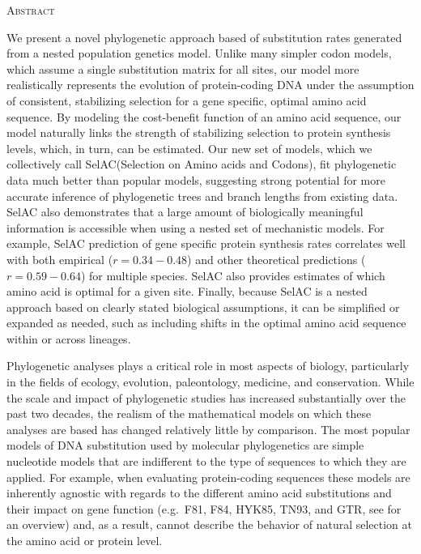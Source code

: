 \documentclass[12pt,letterpaper,fleqn]{article}
\renewcommand{\section}[1]{%
\bigskip
\begin{center}
\begin{Large}
\normalfont\scshape #1
\medskip
\end{Large}
\end{center}}
\renewcommand{\subsection}[1]{%
\bigskip
\begin{center}
\begin{large}
\normalfont\itshape #1
\end{large}
\end{center}}
\newcommand{\selac}{SelAC\xspace}
\begin{document}


\newpage

\section{Abstract}
We present a novel phylogenetic approach based of substitution rates generated from a nested population genetics model.
Unlike many simpler codon models, which assume a single substitution matrix for all sites, our model more realistically represents the evolution of protein-coding DNA under the assumption of consistent, stabilizing selection for a gene specific, optimal amino acid sequence.
By modeling the cost-benefit function of an amino acid sequence, our model naturally links the strength of stabilizing selection to protein synthesis levels, which, in turn, can be estimated.
Our new set of models, which we collectively call \selac (Selection on Amino acids and Codons), fit phylogenetic data much better than popular models, suggesting strong potential for more accurate inference of phylogenetic trees and branch lengths from existing data.
\selac also demonstrates that a large amount of biologically meaningful information is accessible when using a nested set of mechanistic models.
For example, \selac prediction of gene specific protein synthesis rates correlates well with both empirical ($r = 0.34-0.48$) and other theoretical predictions ($r=0.59-0.64$) for multiple species.
\selac also provides estimates of which amino acid is optimal for a given site.
Finally, because SelAC is a nested approach based on clearly stated biological assumptions, it can be simplified or expanded as needed, such as including shifts in the optimal amino acid sequence within or across lineages.
\newpage






Phylogenetic analyses plays a critical role in most aspects of biology, particularly in the fields of ecology, evolution, paleontology, medicine, and conservation.
While the scale and impact of phylogenetic studies has increased substantially over the past two decades, the realism of the mathematical models on which these analyses are based has changed relatively little by comparison.
The most popular models of DNA substitution used by molecular phylogenetics are simple nucleotide models that are indifferent to the type of sequences to which they are applied.
For example, when evaluating protein-coding sequences these models are inherently agnostic with regards to the different amino acid substitutions and their impact on gene function (e.g.~F81, F84, HYK85, TN93, and GTR, see \citet{Yang2014} for an overview) and, as a result, cannot describe the behavior of natural selection at the amino acid or protein level.
\end{document}
